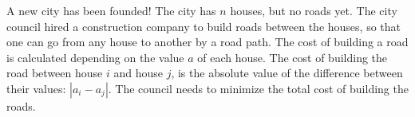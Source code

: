 %
A new city has been founded! The city has $n$ houses, but no roads yet. The city council hired a construction company to build roads between the houses, so that one can go from any house to another by a road path. The cost of building a road is calculated depending on the value $a$ of each house. The cost of building the road between house $i$ and house $j$, is the absolute value of the difference between their values: $ \left| a_i - a_j \right|$. The council needs to minimize the total cost of building the roads.
%
%

%
%



\sampleio
